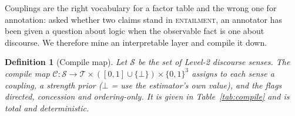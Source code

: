 \documentclass{article} %
\newtheorem{definition}{Definition}
\newcommand{\coupling}[1]{\textsc{#1}}          %
\begin{document}
Couplings are the right vocabulary for a factor table and the wrong one for annotation: asked
whether two claims stand in \coupling{entailment}, an annotator has been given a question about
logic when the observable fact is one about discourse. We therefore mine an interpretable layer
and compile it down.

\begin{definition}[Compile map]
\label{def-compile}
Let $\mathcal{S}$ be the set of Level-2 discourse senses. The compile map
$\mathcal{C}:\mathcal{S}\to\mathcal{T}\times([0,1]\cup\{\bot\})\times\{0,1\}^3$ assigns to
each sense a coupling, a strength prior ($\bot$ = use the estimator's own value), and the
flags \emph{directed}, \emph{concession} and \emph{ordering-only}. It is given in
Table~\ref{tab:compile} and is total and deterministic.
\end{definition}
\end{document}
